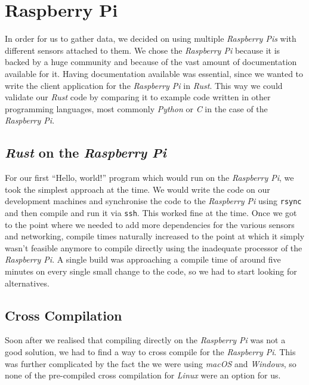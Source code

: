 \section{Raspberry Pi}

In order for us to gather data, we decided on using multiple \textit{Raspberry Pis} with different
sensors attached to them. We chose the \textit{Raspberry Pi} because it is backed by a huge
community and because of the vast amount of documentation available for it. Having documentation
available was essential, since we wanted to write the client application for the \textit{Raspberry
Pi} in \textit{Rust}. This way we could validate our \textit{Rust} code by comparing it to example
code written in other programming languages, most commonly \textit{Python} or \textit{C} in the case
of the \textit{Raspberry Pi}.

\subsection{\textit{Rust} on the \textit{Raspberry Pi}}

For our first “Hello, world!” program which would run on the \textit{Raspberry Pi}, we took the
simplest approach at the time. We would write the code on our development machines and synchronise
the code to the \textit{Raspberry Pi} using \texttt{rsync} \cite{rsync} and then compile and run it
via \texttt{ssh}. This worked fine at the time. Once we got to the point where we needed to add more
dependencies for the various sensors and networking, compile times naturally increased to the point
at which it simply wasn't feasible anymore to compile directly using the inadequate processor of the
\textit{Raspberry Pi}. A single build was approaching a compile time of around five minutes on every
single small change to the code, so we had to start looking for alternatives.

\subsection{Cross Compilation}

Soon after we realised that compiling directly on the \textit{Raspberry Pi} was not a good solution,
we had to find a way to cross compile for the \textit{Raspberry Pi}. This was further complicated by
the fact the we were using \textit{macOS} and \textit{Windows}, so none of the pre-compiled cross
compilation  for \textit{Linux} were an option for us.

